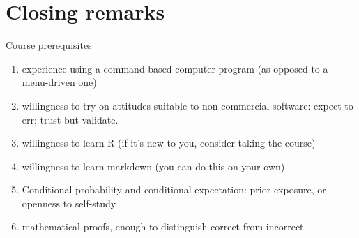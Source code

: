 \section*{Closing remarks}

 
\begin{frame}{Course prerequisites}
  \begin{enumerate}
\item experience using a command-based computer program (as opposed to a menu-driven one)
\item willingness to try on attitudes suitable to
  non-commercial software: expect to err; trust but validate.
\item willingness to learn R  (if it's new to you, consider taking the course)
\item willingness to learn markdown (you can do this on your own)
\item Conditional probability and conditional expectation: prior
  exposure, or openness to self-study
  \item mathematical proofs, enough to distinguish correct from incorrect


  \end{enumerate}
\end{frame}




